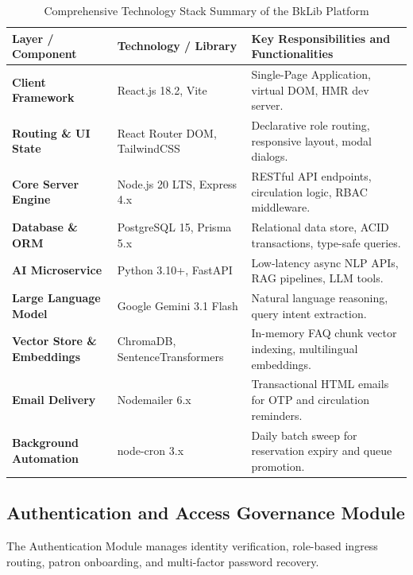 \begin{table}[H]
\centering
\small
\caption{Comprehensive Technology Stack Summary of the BkLib Platform}
\label{tab:tech_stack_summary}
\begin{tabularx}{\linewidth}{|l|l|X|}
\hline
\textbf{Layer / Component} & \textbf{Technology / Library} & \textbf{Key Responsibilities and Functionalities} \\ \hline
\textbf{Client Framework} & React.js 18.2, Vite & Single-Page Application, virtual DOM, HMR dev server. \\ \hline
\textbf{Routing \& UI State} & React Router DOM, TailwindCSS & Declarative role routing, responsive layout, modal dialogs. \\ \hline
\textbf{Core Server Engine} & Node.js 20 LTS, Express 4.x & RESTful API endpoints, circulation logic, RBAC middleware. \\ \hline
\textbf{Database \& ORM} & PostgreSQL 15, Prisma 5.x & Relational data store, ACID transactions, type-safe queries. \\ \hline
\textbf{AI Microservice} & Python 3.10+, FastAPI & Low-latency async NLP APIs, RAG pipelines, LLM tools. \\ \hline
\textbf{Large Language Model} & Google Gemini 3.1 Flash & Natural language reasoning, query intent extraction. \\ \hline
\textbf{Vector Store \& Embeddings} & ChromaDB, SentenceTransformers & In-memory FAQ chunk vector indexing, multilingual embeddings. \\ \hline
\textbf{Email Delivery} & Nodemailer 6.x & Transactional HTML emails for OTP and circulation reminders. \\ \hline
\textbf{Background Automation} & node-cron 3.x & Daily batch sweep for reservation expiry and queue promotion. \\ \hline
\end{tabularx}
\end{table}

\subsection{Authentication and Access Governance Module}

The Authentication Module manages identity verification, role-based ingress routing, patron onboarding, and multi-factor password recovery.

